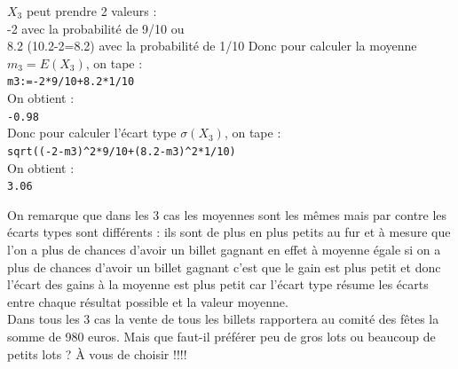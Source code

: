 \documentclass[a4paper,11pt]{book}
\begin{document}
\begin{itemize}
$X_3$ peut prendre 2 valeurs : \\
-2 avec la probabilit\'e de 9/10 ou\\
 8.2 (10.2-2=8.2) avec la probabilit\'e de 1/10
Donc pour calculer la moyenne $m_3=E(X_3)$, on tape :\\
{\tt  m3:=-2*9/10+8.2*1/10}\\
On obtient :\\ 
{\tt  -0.98}\\
Donc pour calculer l'\'ecart type $\sigma(X_3)$, on tape :\\
{\tt  sqrt((-2-m3)\verb|^|2*9/10+(8.2-m3)\verb|^|2*1/10)}\\
On obtient :\\ 
{\tt  3.06}
\end{itemize}
On remarque que dans les 3 cas les moyennes sont les m\^emes mais par contre 
les \'ecarts types sont diff\'erents : ils sont de plus en plus petits au
fur et \`a mesure que l'on a plus de chances d'avoir un billet gagnant en effet
\`a moyenne \'egale si on a plus de chances d'avoir un billet gagnant c'est que
le gain est plus petit et donc l'\'ecart des gains \`a la moyenne est plus petit
car l'\'ecart type r\'esume les \'ecarts entre chaque r\'esultat possible et 
la valeur moyenne.\\
Dans tous les 3 cas la vente de tous les billets rapportera au comit\'e des 
f\^etes la somme de 980 euros. Mais que faut-il pr\'ef\'erer peu de gros 
lots ou beaucoup de petits lots ? \`A vous de choisir !!!!\\
\end{document}
